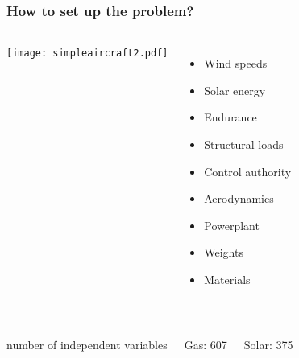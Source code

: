 \documentclass{beamer}
\begin{document}
\begin{frame}
    \frametitle{How to set up the problem?}

    \pause 
    \begin{columns}
        \texttt{[image: simpleaircraft2.pdf]}
        
        \begin{itemize}
            \pause
            \item Wind speeds
            \pause
            \item Solar energy
            \pause
            \item Endurance
            \pause
            \item Structural loads
            \pause
            \item Control authority
            \pause
            \item Aerodynamics
            \pause
            \item Powerplant
            \pause
            \item Weights
            \pause
            \item Materials \\~\\
            \end{itemize}
    \end{columns}
    
    \pause
    \begin{columns}
    \begin{center}
       number of independent variables
    \end{center}
    \begin{columns}
        \begin{center}
        Gas: 607 
        \end{center}
        
        \begin{center}
        Solar: 375
        \end{center}
        
    \end{columns}
    \end{columns}

\end{frame}
\end{document}
